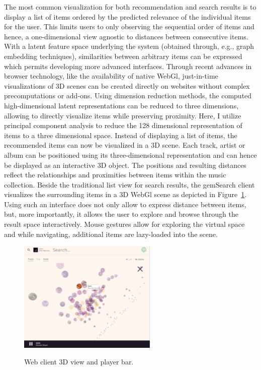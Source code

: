 \documentclass[sigconf]{acmart}
\begin{document}
The most common visualization for both recommendation and search results is to display a list of items ordered by the predicted relevance of the individual items for the user. This limits users to only observing the sequential order of items and hence, a one-dimensional view agnostic to distances between consecutive items. With a latent feature space underlying the system (obtained through, e.g., graph embedding techniques), similarities between arbitrary items can be expressed which permits developing more advanced interfaces. Through recent advances in browser technology, like the availability of native WebGl, just-in-time visualizations of 3D scenes can be created directly on websites without complex precomputations or add-ons. 
Using dimension reduction methods, the computed high-dimensional latent representations can be reduced to three dimensions, allowing to directly visualize items while preserving proximity. Here, I utilize principal component analysis to reduce the 128 dimensional representation of items to a three dimensional space. Instead of displaying a list of items, the recommended items can now be visualized in a 3D scene. Each track, artist or album can be positioned using its three-dimensional representation and can hence be displayed as an interactive 3D object. The positions and resulting distances reflect the relationships and proximities between items within the music collection. Beside the traditional list view for search results, the gemSearch client visualizes the surrounding items in a 3D WebGl scene as depicted in Figure~\ref{fig:web_client_3d}. Using such an interface does not only allow to express distance between items, but, more importantly, it allows the user to explore and browse through the result space interactively. Mouse gestures allow for exploring the virtual space and while navigating, additional items are lazy-loaded into the scene. 


\begin{figure}[ht]
	{\includegraphics[width=250px]{images/webclient_3d.jpg}}	
	\caption{Web client 3D view and player bar.}
	\label{fig:web_client_3d}
\end{figure}
\end{document}
